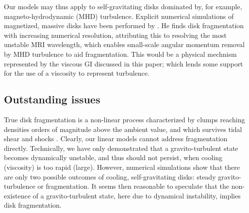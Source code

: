Our models may thus apply to self-gravitating disks dominated by, for
example, magneto-hydrodynamic (MHD) turbulence.   
Explicit numerical simulations of magnetized, massive disks have been performed 
by \cite{fromang05}. He finds disk fragmentation with increasing numerical
resolution, attributing this to resolving the most unstable MRI
wavelength, which enables small-scale angular momentum removal by MHD
turbulence to aid fragmentation. %
This would be a physical mechnism represented by the viscous GI
discussed in this paper; which lends some support for  
the use of a viscosity to represent turbulence.    


\subsection{Outstanding issues}
True disk fragmentation is a non-linear process characterized by clumps   
reaching densities orders of magnitude above the ambient value, and
which survives tidal shear and shocks \citep{paardekooper12}.  
Clearly, our linear models cannot address fragmentation
directly. Technically, we have only demonstrated that a 
gravito-turbulent state becomes dynamically unstable, and thus should
not persist, when cooling (viscosity) is too rapid (large).  
However, numerical simulations show that there are only two
possible outcomes of cooling, self-gravitating disks: steady
gravito-turbulence or fragmentation. It seems then reasonable to 
speculate that the non-existence of a gravito-turbulent state, here due to
dynamical instability, implies disk fragmentation.  


